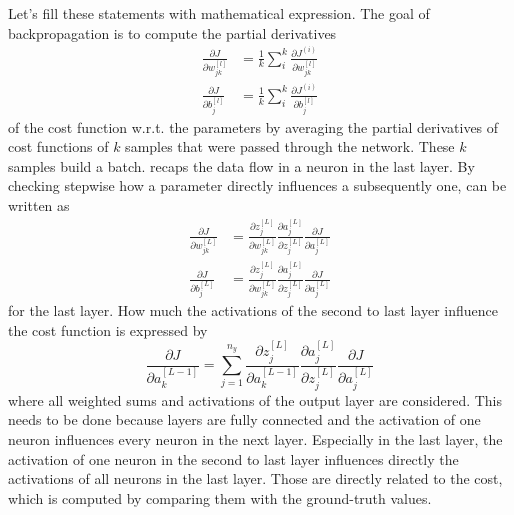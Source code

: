 Let's fill these statements with mathematical expression.
The goal of backpropagation is to compute the partial derivatives
\begin{subequations}
	\label{eq:backpropagation}
	\begin{align}
		\frac{\partial J}{\partial w^{[l]}_{jk}} &= \frac{1}{k} \sum_{i}^{k} \frac{\partial J^{(i)}}{\partial w^{[l]}_{jk}} \\
		\frac{\partial J}{\partial b^{[l]}_j} &= \frac{1}{k} \sum_{i}^{k} \frac{\partial J^{(i)}}{\partial b^{[l]}_j}
	\end{align}
\end{subequations}
of the cost function w.r.t. the parameters by averaging the partial derivatives of cost functions of $k$ samples that were passed through the network.
These $k$ samples build a batch.
 recaps the data flow in a neuron in the last layer.
By checking stepwise how a parameter directly influences a subsequently one,  can be written as
\begin{subequations}
	\label{eq:backpropagation-last}
	\begin{align}
		\frac{\partial J}{\partial w^{[L]}_{jk}} &= \frac{\partial z^{[L]}_j}{\partial w^{[L]}_{jk}} \frac{\partial a^{[L]}_{j}}{\partial z^{[L]}_{j}} \frac{\partial J}{\partial a^{[L]}_{j}} \\
		\frac{\partial J}{\partial b^{[L]}_{j}} &= \frac{\partial z^{[L]}_j}{\partial w^{[L]}_{jk}} \frac{\partial a^{[L]}_{j}}{\partial z^{[L]}_{j}} \frac{\partial J}{\partial a^{[L]}_{j}}
	\end{align}
\end{subequations}
for the last layer.
How much the activations of the second to last layer influence the cost function is expressed by
\begin{equation}
	\label{eq:backpropagation-activations-last}
	\frac{\partial J}{\partial a^{[L-1]}_{k}} = \sum_{j=1}^{n_y} \frac{\partial z^{[L]}_j}{\partial a^{[L-1]}_{k}} \frac{\partial a^{[L]}_{j}}{\partial z^{[L]}_{j}} \frac{\partial J}{\partial a^{[L]}_{j}}
\end{equation}
where all weighted sums and activations of the output layer are considered.
This needs to be done because layers are fully connected and the activation of one neuron influences every neuron in the next layer.
Especially in the last layer, the activation of one neuron in the second to last layer influences directly the activations of all neurons in the last layer.
Those are directly related to the cost, which is computed by comparing them with the ground-truth values.
